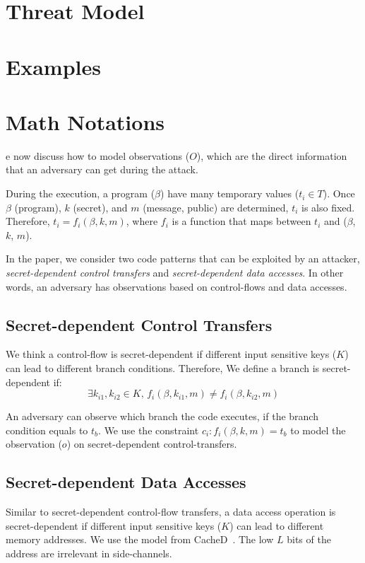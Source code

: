 \section{Threat Model}

\section{Examples}

\section{Math Notations}
e now discuss how to model observations ($O$), which are the direct information
that an adversary can get during the attack.

During the execution, a program ($\beta$) have many temporary values ($t_i \in
T$). Once $\beta$ (program), $k$ (secret), and $m$ (message, public) are
determined, $t_i$ is also fixed. Therefore, $ t_i = f_i(\beta, k, m)$, where $f_
i$ is a function that maps between $t_i$ and ($\beta$, $k$, $m$).

In the paper, we consider two code patterns that can be exploited by an attacker,
\emph{secret-dependent control transfers} and \emph{secret-dependent data
accesses}. In other words, an adversary has observations based on control-flows
and data accesses.

\subsection{Secret-dependent Control Transfers}
We think a control-flow is secret-dependent if different input sensitive keys
($K$) can lead to different branch conditions. Therefore,
We define a branch is secret-dependent if:
$$\exists k_{i1}, k_{i2} \in K, \,f_i(\beta, k_{i1}, m) \neq f_i(\beta, k_{i2}, m)$$

An adversary can observe which branch the code executes, if the branch condition
equals to $t_b$. We use the constraint $c_i : f_i(\beta, k, m) = t_b$ to model
the observation ($o$) on secret-dependent control-transfers.

\subsection{Secret-dependent Data Accesses}
Similar to secret-dependent control-flow transfers, a data access operation is
secret-dependent if different input sensitive keys ($K$) can lead to different
memory addresses. We use the model from CacheD~\cite{203878}. The low $L$ bits
of the address are irrelevant in side-channels.

